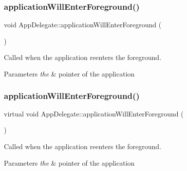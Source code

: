 \subsubsection{\texorpdfstring{application\+Will\+Enter\+Foreground()}{applicationWillEnterForeground()}\hspace{0.1cm}{\footnotesize\ttfamily [2/4]}}
{\footnotesize\ttfamily void App\+Delegate\+::application\+Will\+Enter\+Foreground (\begin{DoxyParamCaption}{ }\end{DoxyParamCaption})\hspace{0.3cm}{\ttfamily [virtual]}}



Called when the application reenters the foreground. 


\begin{DoxyParams}{Parameters}
{\em the} & pointer of the application \\
\hline
\end{DoxyParams}
\mbox{\label{classAppDelegate_a3d566ef257a887953201bf8fe44de8a4}} 
\subsubsection{\texorpdfstring{application\+Will\+Enter\+Foreground()}{applicationWillEnterForeground()}\hspace{0.1cm}{\footnotesize\ttfamily [3/4]}}
{\footnotesize\ttfamily virtual void App\+Delegate\+::application\+Will\+Enter\+Foreground (\begin{DoxyParamCaption}{ }\end{DoxyParamCaption})\hspace{0.3cm}{\ttfamily [virtual]}}



Called when the application reenters the foreground. 


\begin{DoxyParams}{Parameters}
{\em the} & pointer of the application \\
\hline
\end{DoxyParams}
\mbox{\label{classAppDelegate_a3d566ef257a887953201bf8fe44de8a4}} 
